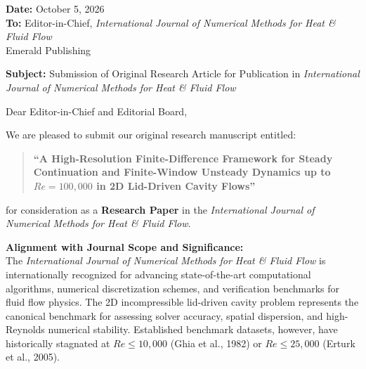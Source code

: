 \documentclass[11pt]{article}
\begin{document}
\noindent\textbf{Date:} October 5, 2026 \\
\textbf{To:} Editor-in-Chief, \textit{International Journal of Numerical Methods for Heat \& Fluid Flow} \\
Emerald Publishing

\vspace{1.5em}

\noindent\textbf{Subject:} Submission of Original Research Article for Publication in \textit{International Journal of Numerical Methods for Heat \& Fluid Flow}

\vspace{1em}

\noindent Dear Editor-in-Chief and Editorial Board,

\vspace{0.8em}
We are pleased to submit our original research manuscript entitled:

\begin{quote}
\textbf{``A High-Resolution Finite-Difference Framework for Steady Continuation and Finite-Window Unsteady Dynamics up to $Re = 100{,}000$ in 2D Lid-Driven Cavity Flows''}
\end{quote}

\noindent for consideration as a \textbf{Research Paper} in the \textit{International Journal of Numerical Methods for Heat \& Fluid Flow}.

\vspace{0.8em}
\noindent\textbf{Alignment with Journal Scope and Significance:} \\
The \textit{International Journal of Numerical Methods for Heat \& Fluid Flow} is internationally recognized for advancing state-of-the-art computational algorithms, numerical discretization schemes, and verification benchmarks for fluid flow physics. The 2D incompressible lid-driven cavity problem represents the canonical benchmark for assessing solver accuracy, spatial dispersion, and high-Reynolds numerical stability. Established benchmark datasets, however, have historically stagnated at $Re \le 10{,}000$ (Ghia et al., 1982) or $Re \le 25{,}000$ (Erturk et al., 2005).
\end{document}
